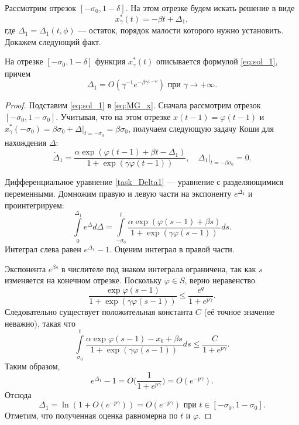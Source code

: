 Рассмотрим отрезок $[-\sigma_0, 1 - \delta]$. На этом отрезке будем искать решение в виде
%
\begin{equation}
	\label{eq:sol_1}
	x_\gamma^*(t) = -\beta t + \Delta_1,
\end{equation}
%
где $\Delta_1 = \Delta_1(t, \phi)$ --- остаток, порядок малости которого нужно установить. Докажем следующий факт.
%
\begin{lemma}
\label{lm:Delta1}
На отрезке $[-\sigma_0, 1 - \delta]$ функция $x_\gamma^*(t)$ описывается формулой \eqref{eq:sol_1}, причем
%
\[
\Delta_1 = O\left(\gamma^{-1} e^{-\beta\gamma^{1 - \nu}}\right) \text{ при } \gamma \to +\infty.
\]
\end{lemma}
\begin{proof}
Подставим \eqref{eq:sol_1} в \eqref{eq:MG_x}. Сначала рассмотрим отрезок $[-\sigma_0, 1 - \sigma_0]$. Учитывая, что на этом отрезке $x(t - 1) = \varphi(t - 1)$ и $x_\gamma^*(-\sigma_0) = \beta \sigma_0 +\Delta|_{t = -\sigma_0} = \beta \sigma_0$, получаем следующую задачу Коши для нахождения $\Delta$: 
\begin{equation}
	\label{task_Delta1}
	\dot{\Delta}_1=\frac{\alpha \exp(\varphi(t-1) + \beta t - \Delta_1)}{1 + \exp(\gamma\varphi(t-1))},\quad \Delta_1|_{t = -\beta \sigma_0}=0.
\end{equation}

Дифференциальное уравнение \eqref{task_Delta1} --- уравнение с разделяющимися переменными. Домножим правую и левую части на экспоненту $e^{\Delta_1}$ и проинтегрируем:
%
\[
\int\limits_0^{\Delta_1} e^\Delta d\Delta=\int\limits_{-\sigma_0}^t \frac{\alpha \exp(\varphi(s-1) + \beta s)}{1 + \exp(\gamma\varphi(s - 1))}ds.
\]
%
Интеграл слева равен $e^{\Delta_1} - 1$. Оценим интеграл в правой части.

Экспонента $e^{\beta s}$ в числителе под знаком интеграла ограничена, так как $s$ изменяется на конечном отрезке. Поскольку $\varphi\in S$, верно неравенство
%
\[
\frac{\exp\varphi(s - 1)}{1 + \exp(\gamma\varphi(s - 1))} \leqslant \frac{e^q}{1 + e^{p \gamma}}.
\]
Следовательно существует положительная константа $C$ (её точное значение неважно), такая что
\[
\int\limits_{\sigma_0}^t\frac{\alpha\exp\varphi(s-1)-x_0+\beta s}{1+\exp(\gamma\varphi(s-1))}ds\leqslant\frac{C}{1+e^{p \gamma}}.
\]
%
Таким образом, 
\[
e^{\Delta_1}-1=O\Big(\frac{1}{1+e^{p \gamma}}\Big)=O(e^{-p \gamma}).
\]
Отсюда 
\[
\Delta_1=\ln(1+O(e^{-p \gamma}))=O(e^{-p \gamma}) \text{ при }t\in[-\sigma_0, 1 - \sigma_0].
\]
Отметим, что полученная оценка равномерна по $t$ и $\varphi$.


\end{proof}
